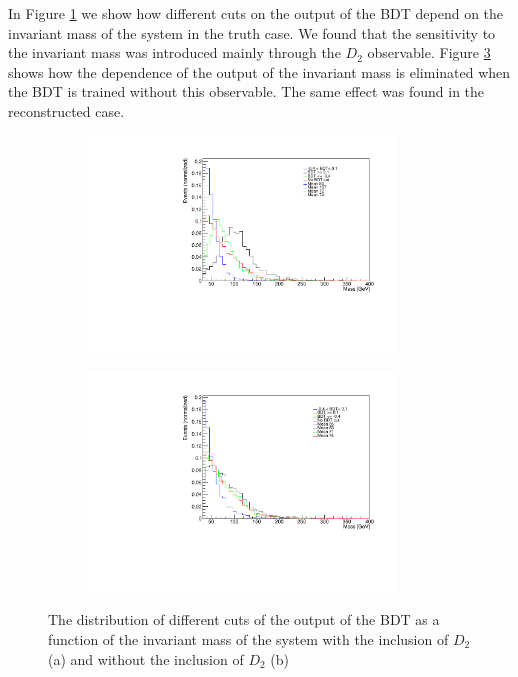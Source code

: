 \documentclass[10pt,a4paper]{book}
\begin{document}
In Figure \ref{bdt with d2} we show how different cuts on the output of the BDT depend on the invariant mass of the system in the truth case. We found that the sensitivity to the invariant mass was introduced mainly through the $D_2$ observable. Figure \ref{bdt w/o d2} shows how the dependence of the output of the invariant mass is eliminated when the BDT is trained without this observable. The same effect was found in the reconstructed case.

\begin{figure}[h]
\begin{subfigure}{1.0\textwidth}
\centering
\includegraphics[width=0.9\textwidth]{ch4_images/bdt_with_d2_included}
\caption{}
\label{bdt with d2}
\end{subfigure}
\begin{subfigure}{1.0\textwidth}
\centering
\includegraphics[width=0.9\textwidth]{ch4_images/bdt_no_d2}
\caption{}
\label{bdt w/o d2}
\end{subfigure}
\caption{The distribution of different cuts of the output of the BDT as a function of the invariant mass of the system with the inclusion of $D_2$ (a) and without the inclusion of $D_2$ (b)}
\end{figure} 
\end{document}
